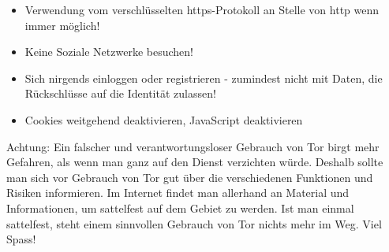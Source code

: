 \begin{itemize}
\item Verwendung vom verschlüsselten https-Protokoll an Stelle von http wenn immer möglich!
\item Keine Soziale Netzwerke besuchen!
\item Sich nirgends einloggen oder registrieren - zumindest nicht mit Daten, die Rückschlüsse auf die Identität zulassen!
\item Cookies weitgehend deaktivieren, JavaScript deaktivieren
\end{itemize}

Achtung: Ein falscher und verantwortungsloser Gebrauch von Tor birgt mehr Gefahren, als wenn man ganz auf den Dienst verzichten würde. Deshalb sollte man sich vor Gebrauch von Tor gut über die verschiedenen Funktionen und Risiken informieren. Im Internet findet man allerhand an Material und Informationen, um sattelfest auf dem Gebiet zu werden. Ist man einmal sattelfest, steht einem sinnvollen Gebrauch von Tor nichts mehr im Weg. Viel Spass! 